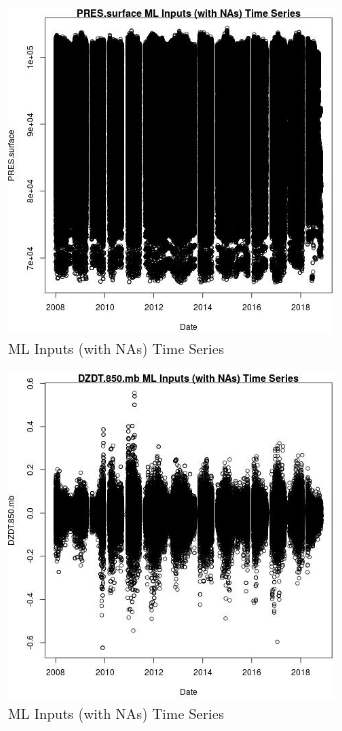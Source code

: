 \begin{figure} 
\centering  
\includegraphics[width=0.77\textwidth]{Code_Outputs/Report_ML_input_PM25_Step4_part_e_de_duplicated_aves_compiled_2019-05-20wNAs_PRESsurfacevDate.jpg} 
\caption{\label{fig:Report_ML_input_PM25_Step4_part_e_de_duplicated_aves_compiled_2019-05-20wNAsPRESsurfacevDate}ML Inputs (with NAs) Time Series} 
\end{figure} 
 

\begin{figure} 
\centering  
\includegraphics[width=0.77\textwidth]{Code_Outputs/Report_ML_input_PM25_Step4_part_e_de_duplicated_aves_compiled_2019-05-20wNAs_DZDT850mbvDate.jpg} 
\caption{\label{fig:Report_ML_input_PM25_Step4_part_e_de_duplicated_aves_compiled_2019-05-20wNAsDZDT850mbvDate}ML Inputs (with NAs) Time Series} 
\end{figure} 
 

